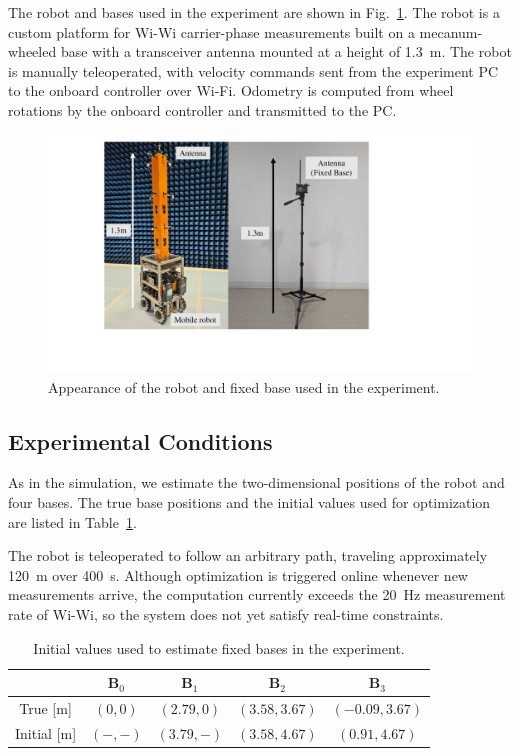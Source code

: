 \documentclass[conference]{IEEEtran}
\begin{document}
The robot and bases used in the experiment are shown in Fig.~\ref{fig:robot}.
The robot is a custom platform for Wi-Wi carrier-phase measurements built on a mecanum-wheeled base with a transceiver antenna mounted at a height of 1.3~m.
The robot is manually teleoperated, with velocity commands sent from the experiment PC to the onboard controller over Wi-Fi.
Odometry is computed from wheel rotations by the onboard controller and transmitted to the PC.

\begin{figure}
    \centering
    \includegraphics[width=0.95\linewidth]{figures/robot}
    \caption{Appearance of the robot and fixed base used in the experiment.}
    \label{fig:robot}
\end{figure}

\subsection{Experimental Conditions}
As in the simulation, we estimate the two-dimensional positions of the robot and four bases.
The true base positions and the initial values used for optimization are listed in Table~\ref{tab:initial_real}.

The robot is teleoperated to follow an arbitrary path, traveling approximately 120~m over 400~s.
Although optimization is triggered online whenever new measurements arrive, the computation currently exceeds the 20~Hz measurement rate of Wi-Wi, so the system does not yet satisfy real-time constraints.

\begin{table}
    \centering
    \caption{Initial values used to estimate fixed bases in the experiment.}
    \begin{tabular}{ccccc}
    \toprule
        &$\mathbf{B}_0$ & $\mathbf{B}_1$ & $\mathbf{B}_2$ & $\mathbf{B}_3$ \\
    \midrule
       True [m]  &$(0,0)$&$(2.79,0)$  &$(3.58,3.67)$ &$(-0.09,3.67)$ \\
       Initial [m] &$(-,-)$&$(3.79,-)$  &$(3.58,4.67)$ &$(0.91,4.67)$ \\
    \bottomrule
    \end{tabular}
    \label{tab:initial_real}
\end{table}
\end{document}
